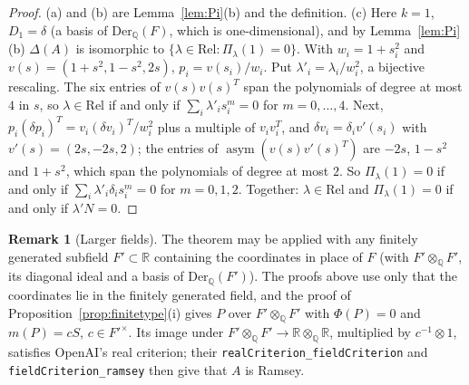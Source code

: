 \documentclass[11pt]{amsart}
\newcommand{\Q}{\mathbb{Q}}
\newcommand{\R}{\mathbb{R}}
\theoremstyle{plain}
\theoremstyle{definition}
\newtheorem{remark}[theorem]{Remark}
\begin{document}
\begin{proof}
(a) and (b) are Lemma~\ref{lem:Pi}(b) and the definition. (c) Here $k=1$, $D_1=\delta$ (a basis of
$\mathrm{Der}_\Q(F)$, which is one-dimensional), and by Lemma~\ref{lem:Pi}(b) $\Delta(A)$ is isomorphic to
$\{\lambda\in\mathrm{Rel}:\Pi_\lambda(1)=0\}$. With $w_i=1+s_i^2$ and $v(s)=(1+s^2,1-s^2,2s)$, $p_i=v(s_i)/w_i$.
Put $\lambda'_i=\lambda_i/w_i^2$, a bijective rescaling. The six entries of $v(s)v(s)^T$ span the
polynomials of degree at most $4$ in $s$, so $\lambda\in\mathrm{Rel}$ if and only if
$\sum_i\lambda'_is_i^m=0$ for $m=0,\dots,4$. Next, $p_i(\delta p_i)^T=v_i(\delta v_i)^T/w_i^2$ plus a
multiple of $v_iv_i^T$, and $\delta v_i=\delta_iv'(s_i)$ with $v'(s)=(2s,-2s,2)$; the entries of
$\operatorname{asym}(v(s)v'(s)^T)$ are $-2s$, $1-s^2$ and $1+s^2$, which span the polynomials of degree at
most $2$. So $\Pi_\lambda(1)=0$ if and only if $\sum_i\lambda'_i\delta_is_i^m=0$ for $m=0,1,2$. Together:
$\lambda\in\mathrm{Rel}$ and $\Pi_\lambda(1)=0$ if and only if $\lambda'N=0$.
\end{proof}

\begin{remark}[Larger fields]\label{rem:largerfield}
The theorem may be applied with any finitely generated subfield $F'\subset\R$ containing the coordinates in
place of $F$ (with $F'\otimes_\Q F'$, its diagonal ideal and a basis of $\mathrm{Der}_\Q(F')$). The proofs above
use only that the coordinates lie in the finitely generated field, and the proof of
Proposition~\ref{prop:finitetype}(i) gives $P$ over $F'\otimes_\Q F'$ with $\Phi(P)=0$ and $m(P)=cS$,
$c\in F'^\times$. Its image under $F'\otimes_\Q F'\to\R\otimes_\Q\R$, multiplied by $c^{-1}\otimes1$, satisfies
OpenAI's real criterion; their \texttt{realCriterion\_\allowbreak{}fieldCriterion} and
\texttt{fieldCriterion\_\allowbreak{}ramsey} then give that $A$ is Ramsey.
\end{remark}
\end{document}

